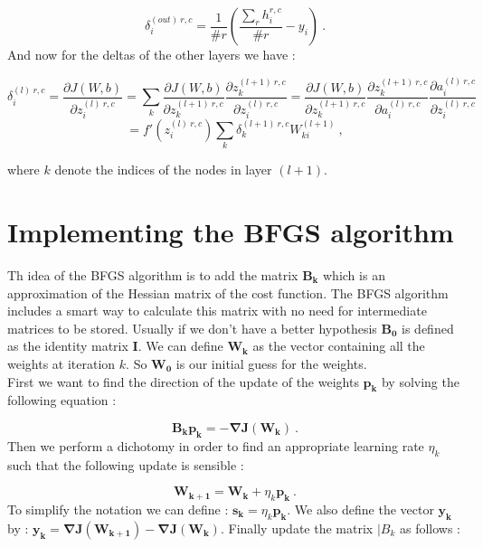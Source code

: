 \documentclass[a4paper,12pt,twoside]{article}
\newcommand{\matr}[1] {\bm{#1}}
\begin{document}
\begin{equation}
\delta^{(out)~r,c}_i = \frac{1}{\# r}\left(\frac{\sum_r h_i^{r,c}}{\# r} - y_i \right)~.
\end{equation}
And now for the deltas of the other layers we have :

\begin{equation}
\delta^{(l)~r,c}_i = \frac{\partial J(W,b)}{\partial z^{(l)~r,c}_i} = \sum_k \frac{\partial J(W,b)}{\partial z^{(l+1)~r,c}_k}\frac{\partial z^{(l+1)~r,c}_k}{\partial z^{(l)~r,c}_i} = \frac{\partial J(W,b)}{\partial z^{(l+1)~r,c}_k}\frac{\partial z^{(l+1)~r,c}_k}{\partial a^{(l)~r,c}_i} \frac{\partial a^{(l)~r,c}_i}{\partial z^{(l)~r,c}_i} 
\end{equation}
\[
= f'(z^{(l)~r,c}_i) \sum_k \delta^{(l+1)~r,c}_k W^{(l+1)}_{ki}~,
\]

where $k$ denote the indices of the nodes in layer $(l+1)$.

\section{Implementing the BFGS algorithm}

Th idea of the BFGS algorithm is to add the matrix $\matr{B_k}$ which is an approximation of the Hessian matrix of the cost function. The BFGS algorithm includes a smart way to calculate this matrix with no need for intermediate matrices to be stored. Usually if we don't have a better hypothesis $\matr{B_0}$ is defined as the identity matrix $\matr{I}$.
We can define $\mathbf{W_k}$ as the vector containing all the weights at iteration $k$. So $\mathbf{W_0}$ is our initial guess for the weights.  \\
First we want to find the direction of the update of the weights $\mathbf{p_k}$ by solving the following equation :  

\begin{equation}
\matr{B_k} \mathbf{p_k} = - \mathbf{\nabla J (\mathbf{W_k})}~.
\end{equation} 
Then we perform a dichotomy in order to find an appropriate learning rate $\eta_k$ such that the following update is sensible :

\begin{equation}
\mathbf{W_{k+1}} = \mathbf{W_k} + \eta_k \mathbf{p_k}~.
\end{equation} 
To simplify the notation we can define : $\mathbf{s_k} = \eta_k  \mathbf{p_k}$. We also define the vector $\mathbf{y_k}$ by : $\mathbf{y_k} = \mathbf{\nabla J (\mathbf{W_{k+1}})} - \mathbf{\nabla J (\mathbf{W_k})}$.
Finally update the matrix $\matr|{B_k}$ as follows :
\end{document}
